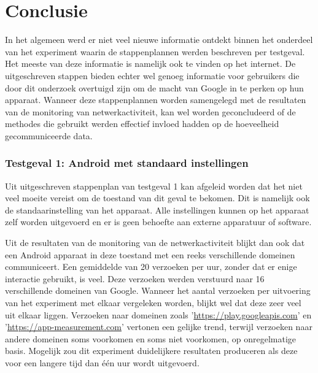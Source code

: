 
\chapter{Conclusie}
\label{ch:conclusie}


In het algemeen werd er niet veel nieuwe informatie ontdekt binnen het onderdeel van het experiment waarin de stappenplannen werden beschreven per testgeval. Het meeste van deze informatie is namelijk ook te vinden op het internet. De uitgeschreven stappen bieden echter wel genoeg informatie voor gebruikers die door dit onderzoek overtuigd zijn om de macht van Google in te perken op hun apparaat. Wanneer deze stappenplannen worden samengelegd met de resultaten van de monitoring van netwerkactiviteit, kan wel worden geconcludeerd of de methodes die gebruikt werden effectief invloed hadden op de hoeveelheid gecommuniceerde data.

\subsection{Testgeval 1: Android met standaard instellingen}
Uit uitgeschreven stappenplan van testgeval 1 kan afgeleid worden dat het niet veel moeite vereist om de toestand van dit geval te bekomen. Dit is namelijk ook de standaarinstelling van het apparaat. Alle instellingen kunnen op het apparaat zelf worden uitgevoerd en er is geen behoefte aan externe apparatuur of software. 

Uit de resultaten van de monitoring van de netwerkactiviteit blijkt dan ook dat een Android apparaat in deze toestand met een reeks verschillende domeinen communiceert. Een gemiddelde van 20 verzoeken per uur, zonder dat er enige interactie gebruikt, is veel. Deze verzoeken werden verstuurd naar 16 verschillende domeinen van Google. Wanneer het aantal verzoeken per uitvoering van het experiment met elkaar vergeleken worden, blijkt wel dat deze zeer veel uit elkaar liggen. Verzoeken naar domeinen zoals '\url{https://play.googleapis.com}' en '\url{https://app-measurement.com}' vertonen een gelijke trend, terwijl verzoeken naar andere domeinen soms voorkomen en soms niet voorkomen, op onregelmatige basis. Mogelijk zou dit experiment duidelijkere resultaten produceren als deze voor een langere tijd dan één uur wordt uitgevoerd.

